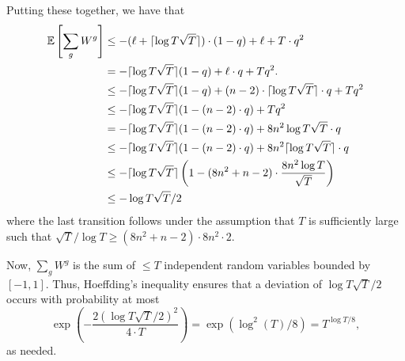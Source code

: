 Putting these together, we have that
\begin{align*}
    \operatorname*{\mathbb{E}}\left[\sum_g W^g\right]
    &\le -(\ell + \lceil\log T \sqrt{T}\rceil) \cdot (1 - q) + \ell + T \cdot q^2\\
    &= -\lceil\log T \sqrt{T}\rceil(1 - q) + \ell \cdot q + T q^2.\\
    &\le  -\lceil\log T \sqrt{T}\rceil(1 - q) + (n - 2) \cdot  \lceil\log T \sqrt{T}\rceil \cdot q + T q^2\\
    &\le -\lceil\log T \sqrt{T}\rceil(1 - (n - 2) \cdot q) + T q^2\\ 
    &= -\lceil\log T \sqrt{T}\rceil(1 - (n - 2) \cdot q) + 8n^2 \log T \sqrt{T} \cdot q\\
    &\le -\lceil\log T \sqrt{T}\rceil(1 - (n - 2) \cdot q) + 8n^2 \lceil\log T \sqrt{T}\rceil \cdot q\\
    &\le -\lceil\log T \sqrt{T}\rceil\left(1 - (8n^2 + n - 2) \cdot \frac{8n^2 \log T}{\sqrt{T}}\right)\\
    &\le -\log T \sqrt{T} / 2
\end{align*}
where the last transition follows under the assumption that $T$ is sufficiently large such that $\sqrt{T} / \log T \ge (8n^2 + n - 2) \cdot 8n^2  \cdot 2$. 

Now, $\sum_g W^g$ is the sum of $\le T$ independent random variables bounded by $[-1, 1]$. Thus, Hoeffding's inequality ensures that a deviation of $\log T \sqrt{T} / 2$ occurs with probability at most \[\exp\left(-\frac{2(\log T \sqrt{T} / 2)^2}{4 \cdot T}\right) = \exp(\log^2(T)/8) = T^{\log T / 8},\]
as needed.
        

